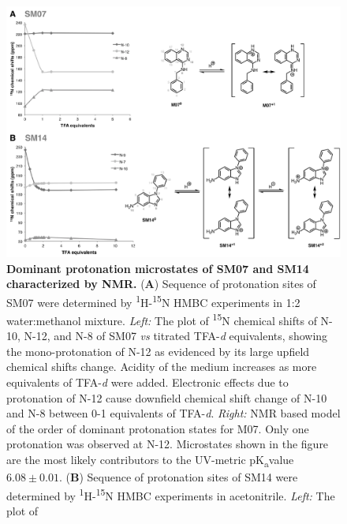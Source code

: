 \documentclass[9pt,lineno]{elife}
\newcommand{\pKa}{pK\textsubscript{a}}
\begin{document}
\begin{figure}
\begin{center}
\includegraphics[width=1.00\linewidth]{figures/NMR_microstates_figure.pdf}
\caption{{\bf Dominant protonation microstates of SM07 and SM14 characterized by NMR.}  (\textbf{A}) Sequence of protonation sites of SM07 were determined by \textsuperscript{1}H-\textsuperscript{15}N HMBC experiments in 1:2 water:methanol mixture. \textit{Left:} The plot of 
\textsuperscript{15}N chemical shifts of N-10, N-12, and N-8 of SM07 \textit{vs} titrated TFA-\textit{d} equivalents, showing the mono-protonation of N-12 as evidenced by its large upfield chemical shifts change. Acidity of the medium increases as more equivalents of TFA-\textit{d} were added. Electronic effects due to protonation of N-12 cause downfield chemical shift change of N-10 and N-8 between 0-1 equivalents of TFA-\textit{d}. \textit{Right:} NMR based model of the order of dominant protonation states for M07. Only one protonation was observed at N-12. Microstates shown in the figure are the most likely contributors to the UV-metric \pKa value $6.08 \pm 0.01$.
(\textbf{B}) Sequence of protonation sites of SM14 were determined by \textsuperscript{1}H-\textsuperscript{15}N HMBC experiments in acetonitrile. \textit{Left:} The plot of 
}
\end{center}
\end{figure}
\end{document}
